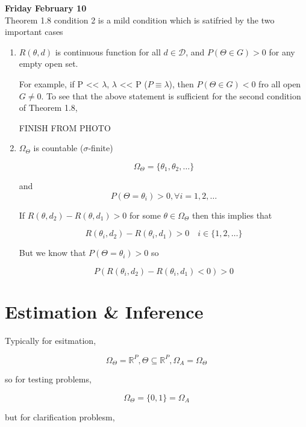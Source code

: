 \documentclass[11pt,fleqn]{book} %
\begin{document}
\textbf{Friday February 10}\\

Theorem 1.8 condition 2 is a mild condition which is satifried by the two important cases

		\begin{enumerate}
			\item $R(\theta, d)$ is continuous function for all $d \in \mathcal{D}$, and $P(\Theta \in G) > 0$ for any empty open set. 


			For example, if P << $\lambda$, $\lambda$ << P ($P \equiv \lambda$), then $P(\Theta \in G) < 0$ fro all open $G \neq 0$. To see that the above statement is sufficient for the second condition of Theorem 1.8, 

			FINISH FROM PHOTO

			\item $\Omega_\Theta$ is countable ($\sigma$-finite)

					$$\Omega_\Theta = \{\theta_1, \theta_2, \dots\} $$

			and
					$$ P(\Theta = \theta_i) > 0, \forall i = 1, 2, \dots $$

			If $R(\theta, d_2) - R(\theta, d_1) > 0$ for some $\theta \in \Omega_\Theta$ then this implies that

					$$ R(\theta_i, d_2) - R(\theta_i, d_1) >0 \quad i \in \{1, 2, \dots\}$$

			But we know that $P(\Theta = \theta_i) > 0$ so 

					$$P(R(\theta_i, d_2) - R(\theta_i, d_1) <0)>0 $$
		\end{enumerate}




\chapter{Estimation \& Inference}

Typically for esitmation, 

	$$\Omega_\Theta = \mathbb{R}^P, \Theta \subseteq \mathbb{R}^P, \Omega_A = \Omega_\Theta $$

so for testing problems, 

		$$\Omega_\Theta = \{0, 1\} = \Omega_A $$

but for clarification problesm, 
\end{document}
